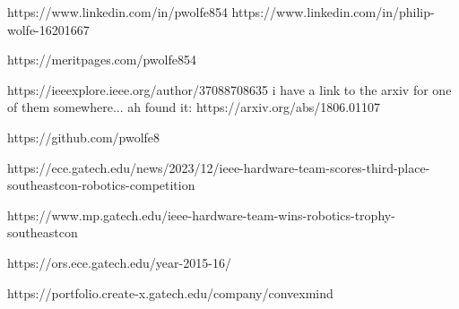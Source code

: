 
https://www.linkedin.com/in/pwolfe854
https://www.linkedin.com/in/philip-wolfe-16201667

https://meritpages.com/pwolfe854

https://ieeexplore.ieee.org/author/37088708635
i have a link to the arxiv for one of them somewhere...   ah found it: https://arxiv.org/abs/1806.01107

https://github.com/pwolfe8


https://ece.gatech.edu/news/2023/12/ieee-hardware-team-scores-third-place-southeastcon-robotics-competition

https://www.mp.gatech.edu/ieee-hardware-team-wins-robotics-trophy-southeastcon


https://ors.ece.gatech.edu/year-2015-16/


https://portfolio.create-x.gatech.edu/company/convexmind


